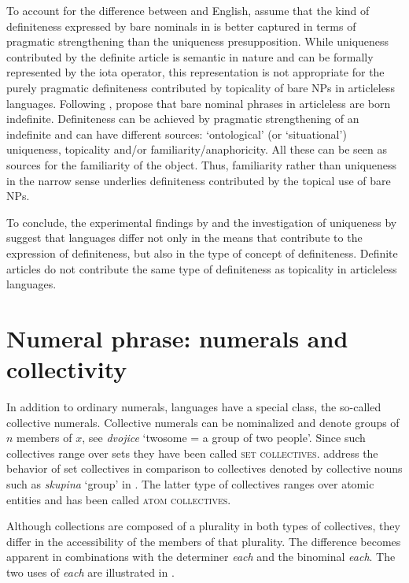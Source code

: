 \documentclass[output=paper]{langscibook}
\begin{document}
\noindent To account for the difference between  and English, \citeauthor{Seres.Borik2021} assume that the kind of definiteness expressed by bare nominals in  is better captured in terms of pragmatic strengthening than the uniqueness presupposition. While uniqueness contributed by the definite article is semantic in nature and can be formally represented by the iota operator, this representation is not appropriate for the purely pragmatic definiteness contributed by topicality of bare NPs in articleless languages. Following \citet{Heim2011}, \citeauthor{Seres.Borik2021} propose that bare nominal phrases in articleless  are born indefinite. Definiteness can be achieved by pragmatic strengthening of an indefinite and can have different sources: `ontological' (or `situational') uniqueness, topicality and/or familiarity/anaphoricity. All these can be seen as sources for the familiarity of the object. Thus, familiarity rather than uniqueness in the narrow sense underlies definiteness contributed by the topical use of bare NPs.

To conclude, the experimental findings by \cite{Simik.Demian2020} and the investigation of uniqueness by \citeauthor{Seres.Borik2021} suggest that languages differ not only in the means that contribute to the expression of definiteness, but also in the type of concept of definiteness. Definite articles do not contribute the same type of definiteness as topicality in articleless languages.
\section{Numeral phrase: numerals and collectivity}

In addition to ordinary numerals,  languages have a special class, the so-called collective numerals. Collective numerals can be nominalized and denote groups of $n$ members of $x$, see  \textit{dvojice} `twosome = a group of two people'. Since such collectives range over sets they have been called \textsc{set collectives}.  address the behavior of set collectives in comparison to collectives denoted by collective nouns such as \textit{skupina} `group' in . The latter type of collectives ranges over atomic entities and has been called \textsc{atom collectives}.

Although collections are composed of a plurality in both types of collectives, they differ in the accessibility of the members of that plurality. The difference becomes apparent in combinations with the determiner \textit{each} and the binominal \textit{each}. The two uses of \textit{each} are illustrated in .
\end{document}
